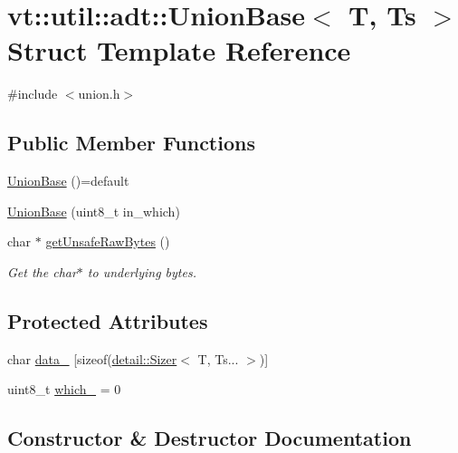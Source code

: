 \hypertarget{structvt_1_1util_1_1adt_1_1_union_base}{}\section{vt\+:\+:util\+:\+:adt\+:\+:Union\+Base$<$ T, Ts $>$ Struct Template Reference}
\label{structvt_1_1util_1_1adt_1_1_union_base}


{\ttfamily \#include $<$union.\+h$>$}

\subsection*{Public Member Functions}
\begin{DoxyCompactItemize}
\item 
\hyperlink{structvt_1_1util_1_1adt_1_1_union_base_a416f7532da93b43567cf3782913c2fa0}{Union\+Base} ()=default
\item 
\hyperlink{structvt_1_1util_1_1adt_1_1_union_base_aa8b965b0431e03984db9000bb7b4cbf9}{Union\+Base} (uint8\+\_\+t in\+\_\+which)
\item 
char $\ast$ \hyperlink{structvt_1_1util_1_1adt_1_1_union_base_af84a8a5eb01bc6f1ff29bab969177a83}{get\+Unsafe\+Raw\+Bytes} ()
\begin{DoxyCompactList}\small\item\em Get the char$\ast$ to underlying bytes. \end{DoxyCompactList}\end{DoxyCompactItemize}
\subsection*{Protected Attributes}
\begin{DoxyCompactItemize}
\item 
char \hyperlink{structvt_1_1util_1_1adt_1_1_union_base_a3badf6a022a698dc00937b3df621caf8}{data\+\_\+} \mbox{[}sizeof(\hyperlink{unionvt_1_1util_1_1adt_1_1detail_1_1_sizer}{detail\+::\+Sizer}$<$ T, Ts... $>$)\mbox{]}
\item 
uint8\+\_\+t \hyperlink{structvt_1_1util_1_1adt_1_1_union_base_ae46ed3323e83507ef0b47ad82db493d0}{which\+\_\+} = 0
\end{DoxyCompactItemize}


\subsection{Constructor \& Destructor Documentation}
\mbox{\label{structvt_1_1util_1_1adt_1_1_union_base_a416f7532da93b43567cf3782913c2fa0}} 
